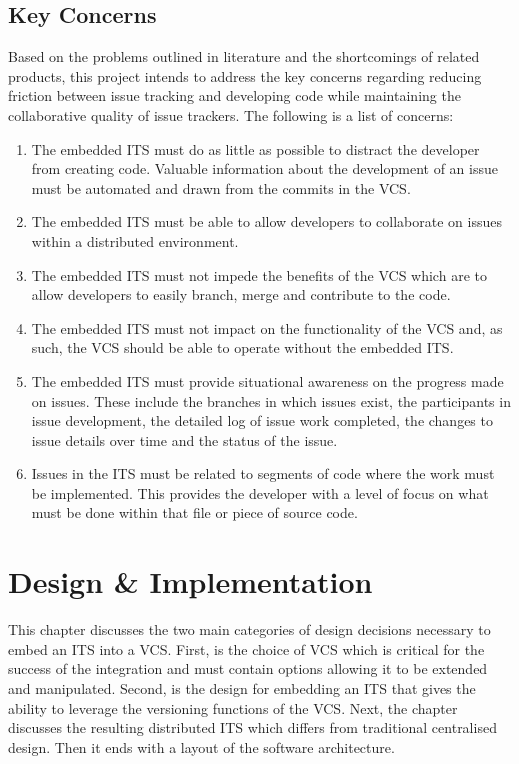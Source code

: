 \documentclass{mproj}
\begin{document}
\section{Key Concerns}

Based on the problems outlined in literature and the shortcomings of related products, this project intends to address the key concerns regarding reducing friction between issue tracking and developing code while maintaining the collaborative quality of issue trackers. The following is a list of concerns:

\begin{enumerate}
  \item The embedded ITS must do as little as possible to distract the developer from creating code. Valuable information about the development of an issue must be automated and drawn from the commits in the VCS.
  \item The embedded ITS must be able to allow developers to collaborate on issues within a distributed environment.
  \item The embedded ITS must not impede the benefits of the VCS which are to allow developers to easily branch, merge and contribute to the code.
  \item The embedded ITS must not impact on the functionality of the VCS and, as such, the VCS should be able to operate without the embedded ITS.
  \item The embedded ITS must provide situational awareness on the progress made on issues. These include the branches in which issues exist, the participants in issue development, the detailed log of issue work completed, the changes to issue details over time and the status of the issue.
  \item Issues in the ITS must be related to segments of code where the work must be implemented. This provides the developer with a level of focus on what must be done within that file or piece of source code.
\end{enumerate}



\chapter{Design {\&} Implementation}\label{design}

This chapter discusses the two main categories of design decisions necessary to embed an ITS into a VCS. First, is the choice of VCS which is critical for the success of the integration and must contain options allowing it to be extended and manipulated. Second, is the design for embedding an ITS that gives the ability to leverage the versioning functions of the VCS. Next, the chapter discusses the resulting distributed ITS which differs from traditional centralised design. Then it ends with a layout of the software architecture.
\end{document}
